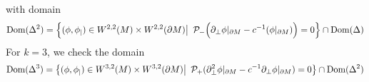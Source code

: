 with domain 
\begin{equation*}
\mathrm{Dom}(\Delta^2) = \Big\{ (\phi, \phi_|) \in W^{2,2}(M)\times W^{2,2}(\partial M) \big\vert\enskip \mathcal{P}_- \Big(\partial_\bot\phi\vert_{\partial M} - c^{-1} (\phi\vert_{\partial M}) \Big) = 0 \Big\} \cap \mathrm{Dom}(\Delta)
\end{equation*}
For $k = 3$, 
we check the domain
\begin{equation*}
\mathrm{Dom}(\Delta^3) = \big\{ (\phi, \phi_|)\in W^{3,2}(M)\times W^{3,2}(\partial M) \big\vert \enskip \mathcal{P}_+(\partial_\bot^2 \phi\vert_{\partial M} - c^{-1}\partial_\bot \phi\vert_{\partial M} ) = 0 \big\} 
\cap \mathrm{Dom}(\Delta^2)
\end{equation*}
%
